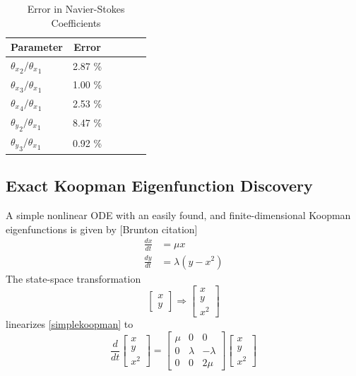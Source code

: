 \documentclass{article}
\begin{document}
\begin{table}[t]
\caption{Error in Navier-Stokes Coefficients}
\label{tab:ns_data}
\vskip 0.15in
\begin{center}
\begin{small}
\begin{sc}
\begin{tabular}{lccccr}
\toprule
Parameter & Error \\
\midrule
${\theta_x}_2 / {\theta_x}_1 $ & 2.87 \% \\
${\theta_x}_3 / {\theta_x}_1 $ & 1.00 \% \\
${\theta_x}_4 / {\theta_x}_1 $ & 2.53 \% \\
${\theta_y}_2 / {\theta_x}_1 $ & 8.47 \% \\
${\theta_y}_3 / {\theta_x}_1 $ & 0.92 \% \\
\bottomrule
\end{tabular}
\end{sc}
\end{small}
\end{center}
\vskip -0.1in
\end{table}

\subsection{Exact Koopman Eigenfunction Discovery}
\label{exactdiscovery}
A simple nonlinear ODE with an easily found, and finite-dimensional Koopman eigenfunctions is given by [Brunton citation]
\begin{align}
  \label{simplekoopman}
\frac{dx}{dt} &= \mu x \\
\frac{dy}{dt} &= \lambda(y - x^2)
\end{align}
The state-space transformation
\begin{equation}
    \label{eqn:exacttransform}
\begin{bmatrix}
x\\
y
\end{bmatrix} \Rightarrow \begin{bmatrix}
x \\
y \\
x^2
\end{bmatrix}
\end{equation}
linearizes \cref{simplekoopman} to
\begin{equation}
    \label{eqn:koopmanop}
\frac{d}{dt} \begin{bmatrix}
x \\
y \\
x^2
\end{bmatrix} = \begin{bmatrix}
\mu & 0 & 0 \\
0 & \lambda & -\lambda \\
0 & 0 & 2 \mu
\end{bmatrix} \begin{bmatrix}
x \\
y \\
x^2
\end{bmatrix}
\end{equation}
\end{document}
